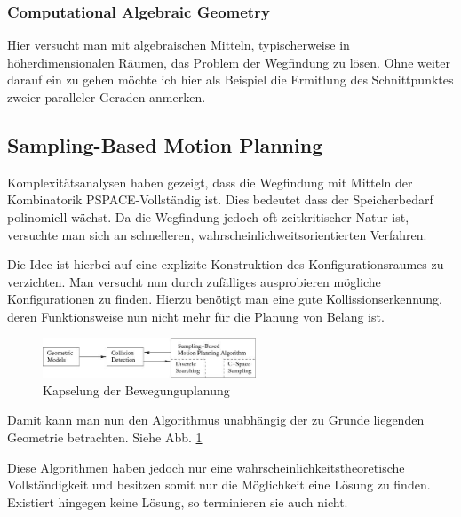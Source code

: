 \documentclass[journal]{IEEEtran}
\begin{document}
\subsubsection{Computational Algebraic Geometry}
Hier versucht man mit algebraischen Mitteln, typischerweise in höherdimensionalen Räumen, das Problem der Wegfindung zu lösen.
\cite{lavalle06} Ohne weiter darauf ein zu gehen möchte ich hier als Beispiel die Ermitlung des Schnittpunktes zweier paralleler Geraden anmerken. 
\subsection{Sampling-Based Motion Planning}
Komplexitätsanalysen haben gezeigt, dass die Wegfindung mit Mitteln der Kombinatorik PSPACE-Vollständig ist.\cite{Rei79}\cite{Can88} Dies bedeutet dass der Speicherbedarf polinomiell wächst. Da die Wegfindung jedoch oft zeitkritischer Natur ist, versuchte man sich an schnelleren, wahrscheinlichweitsorientierten Verfahren. \cite{BL91}\cite{KSLO96} 

Die Idee ist hierbei auf eine explizite Konstruktion des Konfigurationsraumes zu verzichten. Man versucht nun durch zufälliges ausprobieren mögliche Konfigurationen zu finden. Hierzu benötigt man eine gute Kollissionserkennung, deren Funktionsweise nun nicht mehr für die Planung von Belang ist.

\begin{figure}[!t]
\centering
\includegraphics[width=2.5in]{img1670}
\caption{Kapselung der Bewegunguplanung}
\label{mp1}
\end{figure}

Damit kann man nun den Algorithmus unabhängig der zu Grunde liegenden Geometrie betrachten. Siehe Abb. \ref{mp1}
\cite{lavalle06}

Diese Algorithmen haben jedoch nur eine wahrscheinlichkeitstheoretische Vollständigkeit und besitzen somit nur die Möglichkeit eine Lösung zu finden. Existiert hingegen keine Lösung, so terminieren sie auch nicht. \cite{KLMR98}
\end{document}
